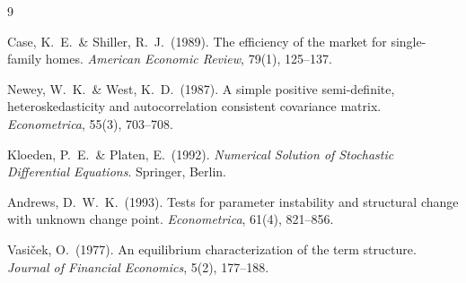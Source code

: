 \documentclass[11pt,a4paper]{article}
\theoremstyle{plain}
\theoremstyle{definition}
\begin{document}
\begin{thebibliography}{9}

  Case, K.~E.\ \& Shiller, R.~J.\ (1989).
  The efficiency of the market for single-family homes.
  \textit{American Economic Review}, 79(1), 125--137.

  Newey, W.~K.\ \& West, K.~D.\ (1987).
  A simple positive semi-definite, heteroskedasticity and
  autocorrelation consistent covariance matrix.
  \textit{Econometrica}, 55(3), 703--708.

  Kloeden, P.~E.\ \& Platen, E.\ (1992).
  \textit{Numerical Solution of Stochastic Differential Equations}.
  Springer, Berlin.

  Andrews, D.~W.~K.\ (1993).
  Tests for parameter instability and structural change with
  unknown change point.
  \textit{Econometrica}, 61(4), 821--856.

  Vasi\v{c}ek, O.\ (1977).
  An equilibrium characterization of the term structure.
  \textit{Journal of Financial Economics}, 5(2), 177--188.

\end{thebibliography}
\end{document}
